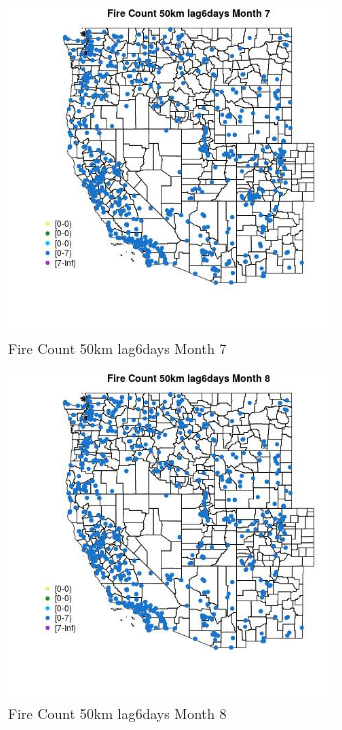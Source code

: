 \begin{figure} 
\centering  
\includegraphics[width=0.77\textwidth]{Code_Outputs/Report_ML_input_PM25_Step4_part_e_de_duplicated_aves_compiled_2019-05-21wNAs_MapObsMo7Fire_Count_50km_lag6days.jpg} 
\caption{\label{fig:Report_ML_input_PM25_Step4_part_e_de_duplicated_aves_compiled_2019-05-21wNAsMapObsMo7Fire_Count_50km_lag6days}Fire Count 50km lag6days Month 7} 
\end{figure} 
 

\clearpage 

\begin{figure} 
\centering  
\includegraphics[width=0.77\textwidth]{Code_Outputs/Report_ML_input_PM25_Step4_part_e_de_duplicated_aves_compiled_2019-05-21wNAs_MapObsMo8Fire_Count_50km_lag6days.jpg} 
\caption{\label{fig:Report_ML_input_PM25_Step4_part_e_de_duplicated_aves_compiled_2019-05-21wNAsMapObsMo8Fire_Count_50km_lag6days}Fire Count 50km lag6days Month 8} 
\end{figure} 
 

